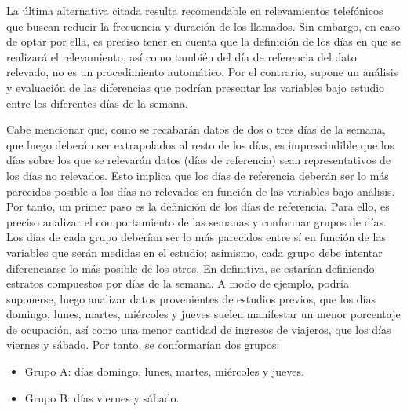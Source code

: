 \documentclass[
]{book}
\begin{document}
La última alternativa citada resulta recomendable en relevamientos telefónicos que buscan reducir la frecuencia y duración de los llamados. Sin embargo, en caso de optar por ella, es preciso tener en cuenta que la definición de los días en que se realizará el relevamiento, así como también del día de referencia del dato relevado, no es un procedimiento automático. Por el contrario, supone un análisis y evaluación de las diferencias que podrían presentar las variables bajo estudio entre los diferentes días de la semana.

Cabe mencionar que, como se recabarán datos de dos o tres días de la semana, que luego deberán ser extrapolados al resto de los días, es imprescindible que los días sobre los que se relevarán datos (días de referencia) sean representativos de los días no relevados. Esto implica que los días de referencia deberán ser lo más parecidos posible a los días no relevados en función de las variables bajo análisis. Por tanto, un primer paso es la definición de los días de referencia. Para ello, es preciso analizar el comportamiento de las semanas y conformar grupos de días. Los días de cada grupo deberían ser lo más parecidos entre sí en función de las variables que serán medidas en el estudio; asimismo, cada grupo debe intentar diferenciarse lo más posible de los otros. En definitiva, se estarían definiendo estratos compuestos por días de la semana. A modo de ejemplo, podría suponerse, luego analizar datos provenientes de estudios previos, que los días domingo, lunes, martes, miércoles y jueves suelen manifestar un menor porcentaje de ocupación, así como una menor cantidad de ingresos de viajeros, que los días viernes y sábado. Por tanto, se conformarían dos grupos:

\begin{itemize}
\item
  Grupo A: días domingo, lunes, martes, miércoles y jueves.
\item
  Grupo B: días viernes y sábado.
\end{itemize}
\end{document}
